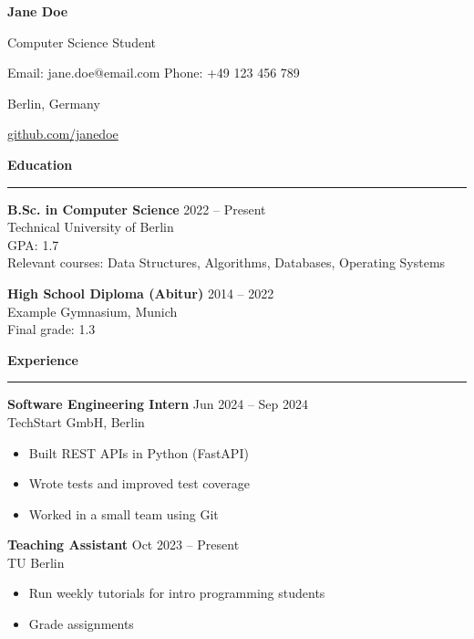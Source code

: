 \documentclass[11pt,a4paper]{article}
\begin{document}
\begin{center}
{\LARGE \textbf{Jane Doe}}

\vspace{4pt}
Computer Science Student

\vspace{4pt}
Email: jane.doe@email.com \quad Phone: +49 123 456 789

Berlin, Germany

\href{https://github.com/janedoe}{github.com/janedoe}
\end{center}

\vspace{10pt}

\noindent \textbf{\large Education}
\hrule
\vspace{6pt}

\textbf{B.Sc. in Computer Science} \hfill 2022 -- Present \\
Technical University of Berlin \\
GPA: 1.7 \\
Relevant courses: Data Structures, Algorithms, Databases, Operating Systems

\vspace{8pt}

\textbf{High School Diploma (Abitur)} \hfill 2014 -- 2022 \\
Example Gymnasium, Munich \\
Final grade: 1.3

\vspace{12pt}

\noindent \textbf{\large Experience}
\hrule
\vspace{6pt}

\textbf{Software Engineering Intern} \hfill Jun 2024 -- Sep 2024 \\
TechStart GmbH, Berlin
\begin{itemize}
\item Built REST APIs in Python (FastAPI)
\item Wrote tests and improved test coverage
\item Worked in a small team using Git
\end{itemize}

\textbf{Teaching Assistant} \hfill Oct 2023 -- Present \\
TU Berlin
\begin{itemize}
\item Run weekly tutorials for intro programming students
\item Grade assignments
\end{itemize}
\end{document}
